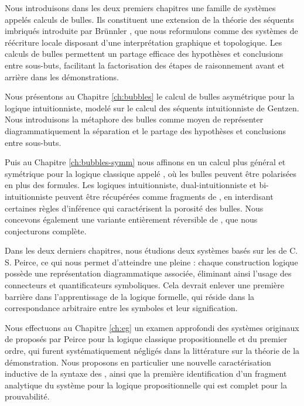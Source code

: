 Nous introduisons dans les deux premiers chapitres une famille de systèmes appelés calculs de bulles. Ils constituent une extension de la théorie des séquents imbriqués introduite par Brünnler \cite{brunnler_deep_2009}, que nous reformulons comme des systèmes de réécriture locale disposant d'une interprétation graphique et topologique. Les calculs de bulles permettent un partage efficace des hypothèses et conclusions entre sous-buts, facilitant la factorisation des étapes de raisonnement avant et arrière dans les démonstrations.

Nous présentons au Chapitre \ref{ch:bubbles} le calcul de bulles asymétrique  pour la logique intuitionniste, modelé sur le calcul des séquents intuitionniste  de Gentzen. Nous introduisons la métaphore des bulles comme moyen de représenter diagrammatiquement la séparation et le partage des hypothèses et conclusions entre sous-buts.

Puis au Chapitre \ref{ch:bubbles-symm} nous affinons  en un calcul plus général et symétrique pour la logique classique appelé , où les bulles peuvent être polarisées en plus des formules. Les logiques intuitionniste, dual-intuitionniste et bi-intuitionniste peuvent être récupérées comme fragments de , en interdisant certaines règles d'inférence qui caractérisent la porosité des bulles. Nous concevons également une variante entièrement réversible de , que nous conjecturons complète.

Dans les deux derniers chapitres, nous étudions deux systèmes basés sur les  de C. S. Peirce, ce qui nous permet d'atteindre une pleine  : chaque construction logique possède une représentation diagrammatique associée, éliminant ainsi l'usage des connecteurs et quantificateurs symboliques. Cela devrait enlever une première barrière dans l'apprentissage de la logique formelle, qui réside dans la correspondance arbitraire entre les symboles et leur signification.

Nous effectuons au Chapitre \ref{ch:eg} un examen approfondi des systèmes originaux de  proposés par Peirce pour la logique classique propositionnelle et du premier ordre, qui furent systématiquement négligés dans la littérature sur la théorie de la démonstration. Nous proposons en particulier une nouvelle caractérisation inductive de la syntaxe des , ainsi que la première identification d'un fragment analytique du système  pour la logique propositionnelle qui est complet pour la prouvabilité.

